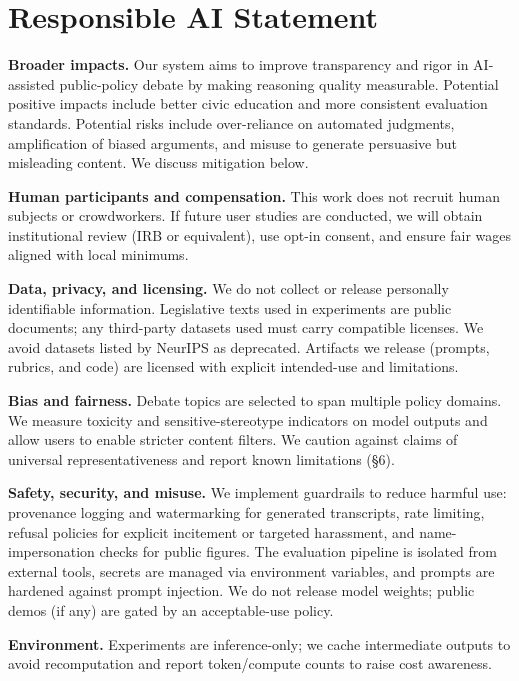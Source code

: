 \documentclass[11pt]{article}
\begin{document}
\section*{Responsible AI Statement}
\textbf{Broader impacts.} Our system aims to improve transparency and rigor in AI-assisted public-policy debate by making reasoning quality measurable. Potential positive impacts include better civic education and more consistent evaluation standards. Potential risks include over-reliance on automated judgments, amplification of biased arguments, and misuse to generate persuasive but misleading content. We discuss mitigation below.

\textbf{Human participants and compensation.} This work does not recruit human subjects or crowdworkers. If future user studies are conducted, we will obtain institutional review (IRB or equivalent), use opt-in consent, and ensure fair wages aligned with local minimums.

\textbf{Data, privacy, and licensing.} We do not collect or release personally identifiable information. Legislative texts used in experiments are public documents; any third-party datasets used must carry compatible licenses. We avoid datasets listed by NeurIPS as deprecated. Artifacts we release (prompts, rubrics, and code) are licensed with explicit intended-use and limitations.

\textbf{Bias and fairness.} Debate topics are selected to span multiple policy domains. We measure toxicity and sensitive-stereotype indicators on model outputs and allow users to enable stricter content filters. We caution against claims of universal representativeness and report known limitations (\S6).

\textbf{Safety, security, and misuse.} We implement guardrails to reduce harmful use: provenance logging and watermarking for generated transcripts, rate limiting, refusal policies for explicit incitement or targeted harassment, and name-impersonation checks for public figures. The evaluation pipeline is isolated from external tools, secrets are managed via environment variables, and prompts are hardened against prompt injection. We do not release model weights; public demos (if any) are gated by an acceptable-use policy.

\textbf{Environment.} Experiments are inference-only; we cache intermediate outputs to avoid recomputation and report token/compute counts to raise cost awareness.
\end{document}
